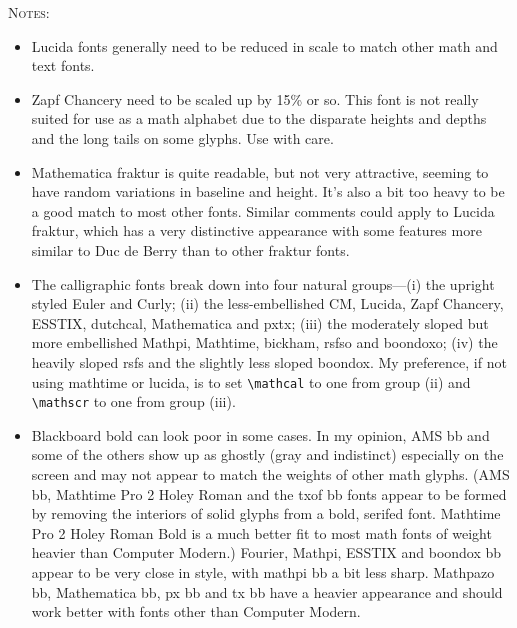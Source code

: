 \documentclass[11pt]{amsart}
\begin{document}
\textsc{Notes:}
\begin{itemize}
\item
Lucida fonts generally need to be reduced in scale to match other math and text fonts.
\item Zapf Chancery need to be scaled up by 15\% or so. This font is not really suited for use as a math alphabet due to the disparate heights and depths and the long tails on some glyphs. Use with care.
\item Mathematica fraktur is quite readable, but not very attractive, seeming to have random variations in baseline and height. It's also a bit too heavy to be a good match to most other fonts. Similar comments could apply to Lucida fraktur, which has a very distinctive appearance with some features more similar to \textsf{Duc de Berry} than to other fraktur fonts.
\item The calligraphic fonts break down into four natural groups---(i) the upright styled Euler and Curly; (ii) the less-embellished CM, Lucida, Zapf Chancery, ESSTIX, dutchcal,  Mathematica and pxtx; (iii) the moderately sloped but more embellished Mathpi, Mathtime, bickham, rsfso and boondoxo; (iv) the heavily sloped rsfs and the slightly less sloped boondox. My preference, if not using \textsf{mathtime} or \textsf{lucida}, is to set \verb|\mathcal| to one from group (ii) and \verb|\mathscr| to one from group (iii).
\item Blackboard bold can look poor in some cases. In my opinion, AMS bb and some of the others show up as ghostly (gray and indistinct) especially on the screen and may not appear to match the weights of other math glyphs. (AMS bb, Mathtime Pro 2 Holey Roman and the txof bb fonts appear to be formed by removing the interiors of solid glyphs from a bold, serifed font. Mathtime Pro 2 Holey Roman Bold is a much better fit to most math fonts of weight heavier than Computer Modern.) Fourier,  Mathpi, ESSTIX and boondox bb appear to be very close in style, with mathpi bb a bit less sharp. Mathpazo bb, Mathematica bb, px bb and tx bb have a heavier appearance and should work better with fonts other than Computer Modern.

\end{itemize}
\end{document}
